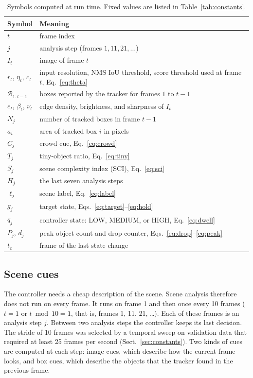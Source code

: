 \documentclass[pdflatex,sn-mathphys-num,iicol]{sn-jnl}
\begin{document}
\begin{table}[t]
\caption{Symbols computed at run time. Fixed values are listed in
Table~\ref{tab:constants}.}
\label{tab:symbols}
\centering\footnotesize
\setlength{\tabcolsep}{4pt}
\begin{tabular}{@{}l>{\raggedright\arraybackslash}p{55mm}@{}}
\toprule
Symbol & Meaning\\
\midrule
$t$ & frame index\\
$j$ & analysis step (frames $1, 11, 21, \dots$)\\
$I_t$ & image of frame $t$\\
$r_t$, $\eta_t$, $c_t$ & input resolution, NMS IoU threshold, score threshold
  used at frame $t$, Eq.~\eqref{eq:theta}\\
$\mathcal{B}_{1:t-1}$ & boxes reported by the tracker for frames $1$ to $t-1$\\
$e_t$, $\beta_t$, $\nu_t$ & edge density, brightness, and sharpness of $I_t$\\
$N_j$ & number of tracked boxes in frame $t-1$\\
$a_i$ & area of tracked box $i$ in pixels\\
$C_j$ & crowd cue, Eq.~\eqref{eq:crowd}\\
$T_j$ & tiny-object ratio, Eq.~\eqref{eq:tiny}\\
$S_j$ & scene complexity index (SCI), Eq.~\eqref{eq:sci}\\
$H_j$ & the last seven analysis steps\\
$\ell_j$ & scene label, Eq.~\eqref{eq:label}\\
$g_j$ & target state, Eqs.~\eqref{eq:target}--\eqref{eq:hold}\\
$q_j$ & controller state: LOW, MEDIUM, or HIGH, Eq.~\eqref{eq:dwell}\\
$P_j$, $d_j$ & peak object count and drop counter,
  Eqs.~\eqref{eq:drop}--\eqref{eq:peak}\\
$t_c$ & frame of the last state change\\
\bottomrule
\end{tabular}
\end{table}

\subsection{Scene cues}\label{sec:cues}
The controller needs a cheap description of the scene. Scene analysis
therefore does not run on every frame. It runs on frame 1 and then once
every 10 frames ($t=1$ or $t \bmod 10 = 1$, that is, frames 1, 11, 21,
\dots). Each of these frames is an analysis step $j$. Between two analysis
steps the controller keeps its last decision. The stride of 10 frames was
selected by a temporal sweep on validation data that required at least 25
frames per second (Sect.~\ref{sec:constants}). Two kinds of cues are computed
at each step: image cues, which describe how the current frame looks, and box
cues, which describe the objects that the tracker found in the previous
frame.
\end{document}
